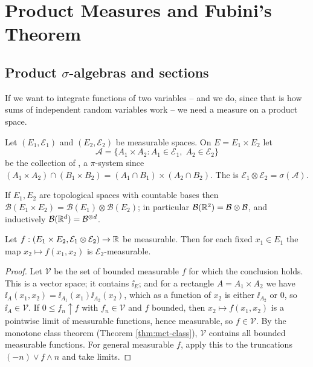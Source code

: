 \documentclass[a4paper]{scrartcl}
\newcommand{\cA}{\mathcal{A}}
\newcommand{\cB}{\mathcal{B}}
\newcommand{\cE}{\mathcal{E}}
\newcommand{\cV}{\mathcal{V}}
\newcommand{\ind}{\ii}
\begin{document}
\section{Product Measures and Fubini's Theorem}

\subsection{Product \texorpdfstring{$\sigma$}{sigma}-algebras and sections}

If we want to integrate functions of two variables -- and we do, since that is how sums of independent random variables work -- we need a measure on a product space.

\begin{definition}
	Let $(E_1,\cE_1)$ and $(E_2,\cE_2)$ be measurable spaces. On $E = E_1\times E_2$ let
	$$
	\cA = \{A_1\times A_2 : A_1 \in \cE_1,\; A_2 \in \cE_2\}
	$$
	be the collection of , a $\pi$-system since $(A_1\times A_2)\cap(B_1\times B_2) = (A_1\cap B_1)\times(A_2\cap B_2)$. The  is $\cE_1\otimes\cE_2 = \sigma(\cA)$.
\end{definition}

If $E_1, E_2$ are topological spaces with countable bases then $\cB(E_1\times E_2) = \cB(E_1)\otimes\cB(E_2)$; in particular $\cB(\R^2)=\cB\otimes\cB$, and inductively $\cB(\R^d) = \cB^{\otimes d}$.

\begin{lemma}\label{lem:sections}
	Let $f : (E_1\times E_2, \cE_1\otimes\cE_2)\to\R$ be measurable. Then for each fixed $x_1 \in E_1$ the map $x_2 \mapsto f(x_1,x_2)$ is $\cE_2$-measurable.
\end{lemma}
\begin{proof}
	Let $\cV$ be the set of bounded measurable $f$ for which the conclusion holds. This is a vector space; it contains $\ind_E$; and for a rectangle $A = A_1\times A_2$ we have $\ind_A(x_1,x_2) = \ind_{A_1}(x_1)\ind_{A_2}(x_2)$, which as a function of $x_2$ is either $\ind_{A_2}$ or $0$, so $\ind_A \in \cV$. If $0 \leq f_n \uparrow f$ with $f_n \in \cV$ and $f$ bounded, then $x_2\mapsto f(x_1,x_2)$ is a pointwise limit of measurable functions, hence measurable, so $f \in \cV$. By the monotone class theorem (Theorem \ref{thm:mct-class}), $\cV$ contains all bounded measurable functions. For general measurable $f$, apply this to the truncations $(-n)\vee f\wedge n$ and take limits.
\end{proof}
\end{document}
